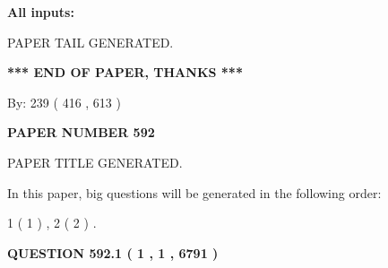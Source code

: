 \documentclass{ctexart}
\begin{document}
   
   
   
\noindent{}
   
   
   
   
\noindent\vspace{0.1in}\hspace{-0.08in} {\textbf{\Large{All inputs: }}}
   
   
   
   
   
   
 \vspace{0.2in}
 
   
   
\vspace{2.0in} PAPER TAIL GENERATED.
   
   
   
   
\vspace{1.0in} 
{\textbf{\large{ *** END OF PAPER, THANKS *** }}} 
   
   
\hspace{1.0in} By: 
 239 ( 416 ,  613 )
   
   
   
   
\newpage 
\setcounter{page}{ 
   592001 } 
   
   
   
   
 {\textbf{ \Large{ PAPER NUMBER  592  }}}
   
   
\vspace{0.2in}
   
   
   
   
   
   
   
   
 \vspace{0.2in}
 
 
 
 
   
   
 PAPER TITLE GENERATED.
   
   
   
\vspace{0.2in}
   
In this paper, big questions will be generated in the following order: 
   
   
   1 ( 1 )
 ,
   2 ( 2 )
 .
  
\vspace{0.2in}
  
{\textbf{\Large{QUESTION
592.1 
 ( 1 , 1 , 6791 )
}}}
  
\end{document}
